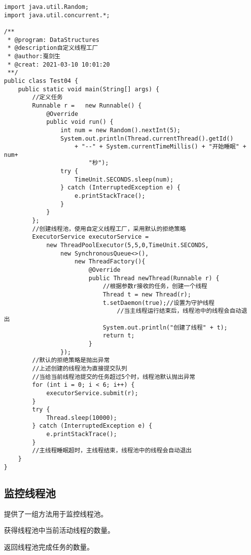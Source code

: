 \documentclass[a4paper]{report}
\begin{document}
\begin{Verbatim}[frame=single,numbersep=5pt,xleftmargin=1.5em,xrightmargin=1.5em]
import java.util.Random;
import java.util.concurrent.*;

/**
 * @program: DataStructures
 * @description自定义线程工厂
 * @author:戛剑生
 * @creat: 2021-03-10 10:01:20
 **/
public class Test04 {
    public static void main(String[] args) {
        //定义任务
        Runnable r =   new Runnable() {
            @Override
            public void run() {
                int num = new Random().nextInt(5);
                System.out.println(Thread.currentThread().getId()
                    + "--" + System.currentTimeMillis() + "开始睡眠" + num+
                        "秒");
                try {
                    TimeUnit.SECONDS.sleep(num);
                } catch (InterruptedException e) {
                    e.printStackTrace();
                }
            }
        };
        //创建线程池，使用自定义线程工厂，采用默认的拒绝策略
        ExecutorService executorService =
            new ThreadPoolExecutor(5,5,0,TimeUnit.SECONDS,
                new SynchronousQueue<>(),
                    new ThreadFactory(){
                        @Override
                        public Thread newThread(Runnable r) {
                            //根据参数r接收的任务，创建一个线程
                            Thread t = new Thread(r);
                            t.setDaemon(true);//设置为守护线程
                                //当主线程运行结束后，线程池中的线程会自动退出
                            System.out.println("创建了线程" + t);
                            return t;
                        }
                });
        //默认的拒绝策略是抛出异常
        //上述创建的线程池为直接提交队列
        //当给当前线程池提交的任务超过5个时，线程池默认抛出异常
        for (int i = 0; i < 6; i++) {
            executorService.submit(r);
        }
        try {
            Thread.sleep(10000);
        } catch (InterruptedException e) {
            e.printStackTrace();
        }
        //主线程睡眠超时，主线程结束，线程池中的线程会自动退出
    }
}\end{Verbatim}
\subsection{监控线程池}
提供了一组方法用于监控线程池。

获得线程池中当前活动线程的数量。

返回线程池完成任务的数量。
\end{document}
